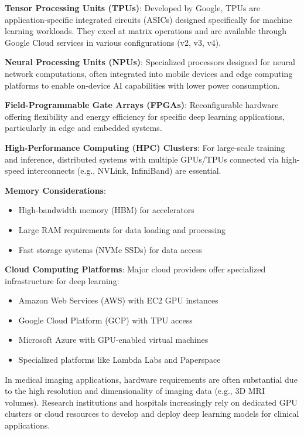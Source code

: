 \textbf{Tensor Processing Units (TPUs)}:
Developed by Google, TPUs are application-specific integrated circuits (ASICs) designed specifically for machine learning workloads. They excel at matrix operations and are available through Google Cloud services in various configurations (v2, v3, v4).

\textbf{Neural Processing Units (NPUs)}:
Specialized processors designed for neural network computations, often integrated into mobile devices and edge computing platforms to enable on-device AI capabilities with lower power consumption.

\textbf{Field-Programmable Gate Arrays (FPGAs)}:
Reconfigurable hardware offering flexibility and energy efficiency for specific deep learning applications, particularly in edge and embedded systems.

\textbf{High-Performance Computing (HPC) Clusters}:
For large-scale training and inference, distributed systems with multiple GPUs/TPUs connected via high-speed interconnects (e.g., NVLink, InfiniBand) are essential.

\textbf{Memory Considerations}:
\begin{itemize}
  \item High-bandwidth memory (HBM) for accelerators
  \item Large RAM requirements for data loading and processing
  \item Fast storage systems (NVMe SSDs) for data access
\end{itemize}

\textbf{Cloud Computing Platforms}:
Major cloud providers offer specialized infrastructure for deep learning:
\begin{itemize}
  \item Amazon Web Services (AWS) with EC2 GPU instances
  \item Google Cloud Platform (GCP) with TPU access
  \item Microsoft Azure with GPU-enabled virtual machines
  \item Specialized platforms like Lambda Labs and Paperspace
\end{itemize}

In medical imaging applications, hardware requirements are often substantial due to the high resolution and dimensionality of imaging data (e.g., 3D MRI volumes). Research institutions and hospitals increasingly rely on dedicated GPU clusters or cloud resources to develop and deploy deep learning models for clinical applications.

